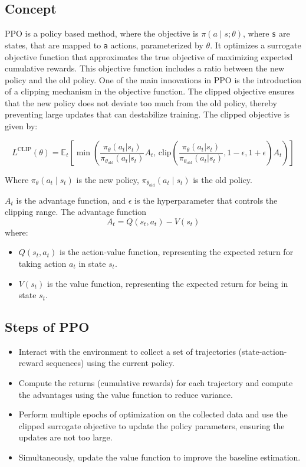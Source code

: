 \documentclass{article}
\begin{document}
\subsection{Concept}
	
	PPO is a policy based method, where the objective is $\pi(a \mid s; \theta)$, where {\tt s} are states, that are mapped to {\tt a} actions, parameterized by {\tt\(\theta\)}. It optimizes a surrogate objective function that approximates the true objective of maximizing expected cumulative rewards. This objective function includes a ratio between the new policy and the old policy. One of the main innovations in PPO is the introduction of a clipping mechanism in the objective function. The clipped objective ensures that the new policy does not deviate too much from the old policy, thereby preventing large updates that can destabilize training. The clipped objective is given by:

\begin{equation}
L^{\text{CLIP}}(\theta) = \mathbb{E}_t \left[ \min \left( \frac{\pi_\theta(a_t | s_t)}{\pi_{\theta_{\text{old}}}(a_t | s_t)} A_t, \, \text{clip} \left( \frac{\pi_\theta(a_t | s_t)}{\pi_{\theta_{\text{old}}}(a_t | s_t)}, 1 - \epsilon, 1 + \epsilon \right) A_t \right) \right]
\end{equation}

Where $\pi_\theta(a_t \mid s_t)$ is the new policy, $\pi_{\theta_{\text{old}}}(a_t \mid s_t)$ is the old policy.

$A_t$ is the advantage function, and $\epsilon$ is the hyperparameter that controls the clipping range.
The advantage function
\begin{equation}
A_t = Q(s_t, a_t) - V(s_t)
\end{equation}
where:
\begin{itemize}
    \item \( Q(s_t, a_t) \) is the action-value function, representing the expected return for taking action \( a_t \) in state \( s_t \).
    \item \( V(s_t) \) is the value function, representing the expected return for being in state \( s_t \).
\end{itemize}

\subsection{Steps of PPO}

\begin{itemize}
	\item Interact with the environment to collect a set of trajectories (state-action-reward sequences) using the current policy.
	\item Compute the returns (cumulative rewards) for each trajectory and compute the advantages using the value function to reduce variance.
	\item Perform multiple epochs of optimization on the collected data and use the clipped surrogate objective to update the policy parameters, ensuring the updates are not too large.
	\item Simultaneously, update the value function to improve the baseline estimation.
\end{itemize}
\end{document}
